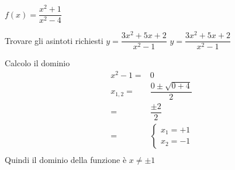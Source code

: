\begin{exercise}[no solution]
$f(x)= \dfrac{x^2+1}{x^2-4}$
\end{exercise}
\begin{exercise}
	Trovare gli asintoti richiesti
$y=\dfrac{3x^2+5x+2}{x^2-1}$
	\tcblower
	$y=\dfrac{3x^2+5x+2}{x^2-1}$
	
Calcolo il dominio
\begin{align*}
x^2-1=&0\\ 
x_{1,2}=&\dfrac{0\pm\sqrt{0+4}}{2}\\
=&\dfrac{\pm 2}{2}\\
=&\begin{cases}
x_1=+1\\
x_2=-1
\end{cases}\\
\end{align*}
Quindi il dominio della funzione è  $x\neq\pm1$


\end{exercise}
